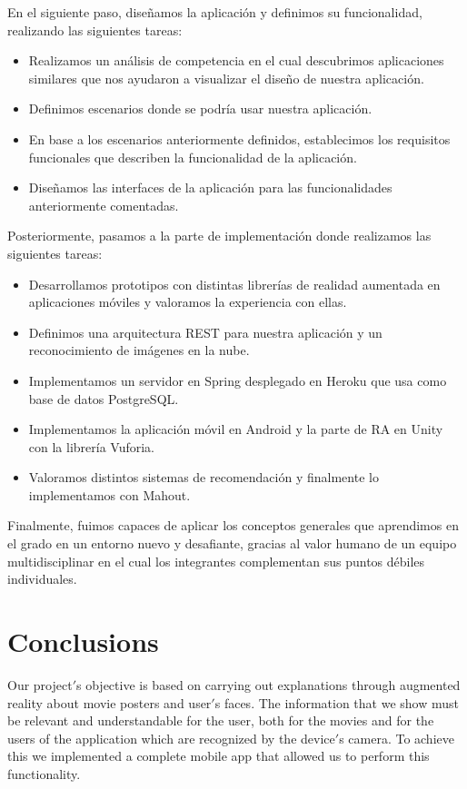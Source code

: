 En el siguiente paso, diseñamos la aplicación y definimos su funcionalidad,
 realizando las siguientes tareas:
\begin{itemize}
    \item Realizamos un análisis de competencia en el cual descubrimos
     aplicaciones similares que nos ayudaron a visualizar el diseño de nuestra
     aplicación.
    \item Definimos escenarios donde se podría usar nuestra aplicación.
    \item En base a los escenarios anteriormente definidos, establecimos los
     requisitos funcionales que describen la funcionalidad de la aplicación.
    \item Diseñamos las interfaces de la aplicación para las funcionalidades
     anteriormente comentadas.
\end{itemize}

Posteriormente, pasamos a la parte de implementación donde realizamos las
 siguientes tareas:
\begin{itemize}
    \item Desarrollamos prototipos con distintas librerías de realidad
     aumentada en aplicaciones móviles y valoramos la experiencia con ellas.
    \item Definimos una arquitectura REST para nuestra aplicación y un
     reconocimiento de imágenes en la nube.
    \item Implementamos un servidor en Spring desplegado en Heroku que usa como
     base de datos PostgreSQL.
    \item Implementamos la aplicación móvil en Android y la parte de RA en Unity
     con la librería Vuforia.
    \item Valoramos distintos sistemas de recomendación y finalmente lo
     implementamos con Mahout.
\end{itemize}

Finalmente, fuimos capaces de aplicar los conceptos generales que aprendimos
 en el grado en un entorno nuevo y desafiante, gracias al valor humano de
 un equipo multidisciplinar en el cual los integrantes complementan sus
 puntos débiles individuales. 

\section{Conclusions}
Our project$'$s objective is based on carrying out explanations through augmented reality 
about movie posters and user$'$s faces. 
The information that we show must be relevant and 
understandable for the user, both for the movies and for the users of the application which are
recognized by the device$'$s camera. To achieve this we implemented a complete mobile app that 
allowed us to perform this functionality.

